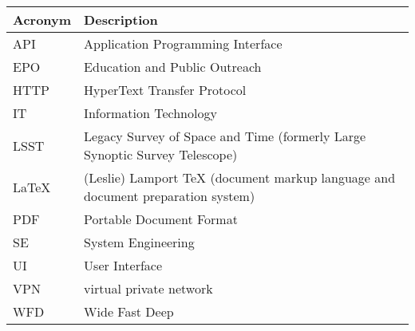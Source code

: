 \addtocounter{table}{-1}
\begin{longtable}{p{}p{}}\hline
\textbf{Acronym} & \textbf{Description}  \\\hline

API & Application Programming Interface \\\hline
EPO & Education and Public Outreach \\\hline
HTTP & HyperText Transfer Protocol \\\hline
IT & Information Technology \\\hline
LSST & Legacy Survey of Space and Time (formerly Large Synoptic Survey Telescope) \\\hline
LaTeX & (Leslie) Lamport TeX (document markup language and document preparation system) \\\hline
PDF & Portable Document Format \\\hline
SE & System Engineering \\\hline
UI & User Interface \\\hline
VPN & virtual private network \\\hline
WFD & Wide Fast Deep \\\hline
\end{longtable}
